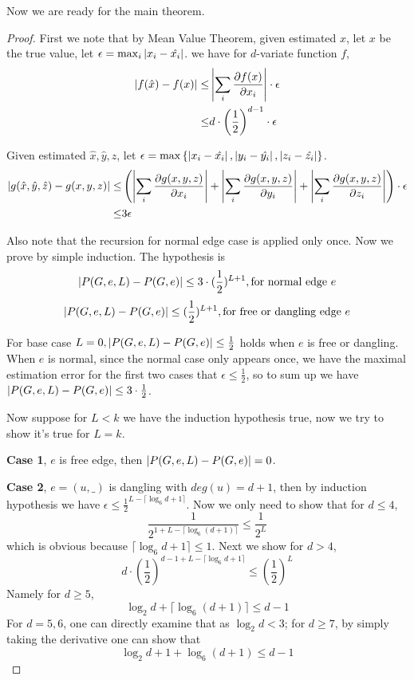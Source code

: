 	Now we are ready for the main theorem.

	\begin{proof}
		First we note that by Mean Value Theorem,
		given estimated $\hat{x}$, let $x$ be the true value, let $\epsilon = \max_i{\left\vert x_i - \hat{x_i}\right\vert}$.
		we have for $d$-variate function $f$,
		\begin{align*}
		\left\vert f(\hat{x}) - f(x)\right\vert \leq& \left\vert\sum_i \frac{\partial f(x)}{\partial x_i}\right\vert \cdot \epsilon \\
		\leq & d\cdot \left( \frac{1}{2} \right)^{d-1} \cdot \epsilon
		\end{align*}

		Given estimated $\hat{x},\hat{y},\hat{z}$, let $\epsilon = \max \left\{\left\vert x_i - \hat{x_i}\right\vert, \left\vert y_i - \hat{y_i} \right\vert , \left\vert z_i - \hat{z_i}\right\vert\right\}$.
		\begin{align*}
		\left\vert g(\hat{x}, \hat{y}, \hat{z}) - g(x,y,z)\right\vert \leq & \left(  \left\vert\sum_i \frac{\partial g(x,y,z)}{\partial x_i}\right\vert +\left\vert \sum_i \frac{\partial g(x,y,z)}{\partial y_i}\right\vert + \left\vert \sum_i \frac{\partial g(x,y,z)}{\partial z_i}\right\vert \right) \cdot \epsilon \\
		\leq & 3\epsilon
		\end{align*}


		Also note that the recursion for normal edge case is applied only once.
		Now we prove by simple induction.
		The hypothesis is
		\[\left\vert P(G,e,L) - P(G,e)\right\vert \leq 3\cdot(\frac{1}{2})^{L+1}, \textrm{for normal edge $e$}\]
		\[\left\vert P(G,e,L) - P(G,e)\right\vert \leq (\frac{1}{2})^{L+1}, \textrm{for free or dangling edge $e$}\]
		
		For base case $L=0, \left\vert P(G,e,L) - P(G,e)\right\vert \leq \frac{1}{2}$ holds when $e$ is free or dangling. When $e$ is normal, since the normal case only appears once, we have the maximal estimation error for the first two cases that $\epsilon \leq \frac{1}{2}$, so to sum up we have $\left\vert P(G,e,L) - P(G,e)\right\vert \leq 3\cdot\frac{1}{2}$.

		Now suppose for $L<k$ we have the induction hypothesis true, now we try to show it's true for $L=k$.

		{\bf Case 1}, $e$ is free edge, then $\left\vert P(G,e,L) - P(G,e)\right\vert = 0$.

		{\bf Case 2}, $e=(u,\_)$ is dangling with $deg(u)=d+1$, then by induction hypothesis we have $\epsilon \leq \frac{1}{2}^{L-\lceil \log_6{d+1}\rceil}$.
		Now we only need to show that for $d \leq 4$,
		\[\frac{1}{2^{1+L-\lceil \log_6{(d+1)}\rceil}} \leq \frac{1}{2^L}\]
		which is obvious because $\lceil\log_6{d+1}\rceil \leq 1$.
		Next we show for $d >4$, 
		\[ d\cdot \left( \frac{1}{2} \right)^{d-1 + L - \lceil \log_6{d+1}\rceil}  \leq \left( \frac{1}{2} \right)^L \]
		Namely for $d \geq 5$,
		\[ \log_2 d + \lceil \log_6{(d+1)} \rceil \leq d-1\]
		For $d=5,6$, one can directly examine that as $\log_2 d < 3$; for $d\geq7$, by simply taking the derivative one can show that
		\[ \log_2 d + 1 + \log_6{(d+1)} \leq d-1\]


\end{proof}

